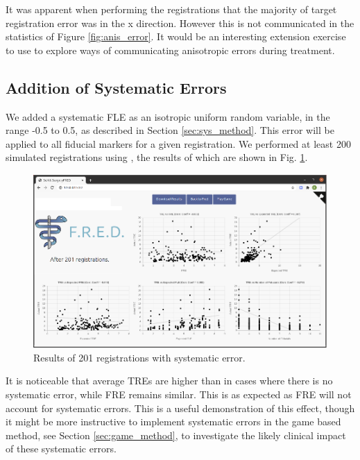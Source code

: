 It was apparent when performing the registrations that the majority of target 
registration error was in the x direction. However this is not communicated in the 
statistics of Figure \ref{fig:anis_error}. It would be an interesting extension 
exercise to use \fred to explore ways of communicating anisotropic errors during 
treatment.

\subsection{Addition of Systematic Errors}
We added a systematic \gls{FLE} as an isotropic uniform random variable, in the range
-0.5 to 0.5, as described in Section \ref{sec:sys_method}. This error will be applied to all fiducial markers for a 
given registration. We performed at least 200 simulated registrations using \fredns, the results of which are shown in Fig. \ref{fig:sys_error}.
\begin{figure}
	\begin{center}
			\includegraphics[width=0.9\linewidth]{images/systematic_error.eps}
			\caption{\label{fig:sys_error}Results of 201 registrations with systematic error.}
	\end{center}
\end{figure}

It is noticeable that average \gls{TRE}s are higher than in cases where there is no
systematic error, while \gls{FRE} remains similar. This is as expected as \gls{FRE} will 
not account for systematic errors. This is a useful demonstration of this effect, though 
it might be more instructive to implement systematic errors in the game based method, see
Section \ref{sec:game_method}, to investigate the likely clinical impact of these
systematic errors.

